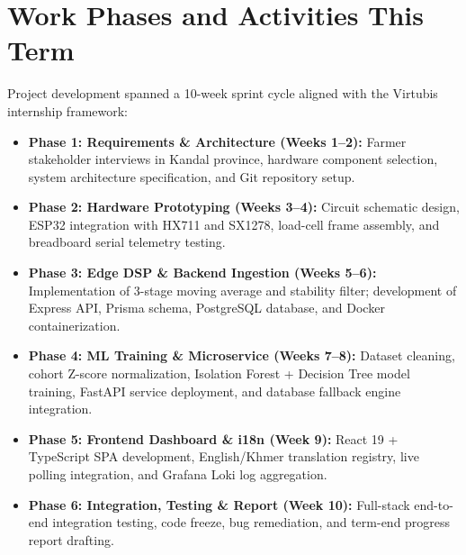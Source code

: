 \documentclass[11pt,a4paper]{report}
\begin{document}
\section{Work Phases and Activities This Term}
Project development spanned a 10-week sprint cycle aligned with the Virtubis internship framework:
\begin{itemize}
    \item \textbf{Phase 1: Requirements \& Architecture (Weeks 1--2):} Farmer stakeholder interviews in Kandal province, hardware component selection, system architecture specification, and Git repository setup.
    \item \textbf{Phase 2: Hardware Prototyping (Weeks 3--4):} Circuit schematic design, ESP32 integration with HX711 and SX1278, load-cell frame assembly, and breadboard serial telemetry testing.
    \item \textbf{Phase 3: Edge DSP \& Backend Ingestion (Weeks 5--6):} Implementation of 3-stage moving average and stability filter; development of Express API, Prisma schema, PostgreSQL database, and Docker containerization.
    \item \textbf{Phase 4: ML Training \& Microservice (Weeks 7--8):} Dataset cleaning, cohort Z-score normalization, Isolation Forest + Decision Tree model training, FastAPI service deployment, and database fallback engine integration.
    \item \textbf{Phase 5: Frontend Dashboard \& i18n (Week 9):} React 19 + TypeScript SPA development, English/Khmer translation registry, live polling integration, and Grafana Loki log aggregation.
    \item \textbf{Phase 6: Integration, Testing \& Report (Week 10):} Full-stack end-to-end integration testing, code freeze, bug remediation, and term-end progress report drafting.
\end{itemize}
\end{document}
